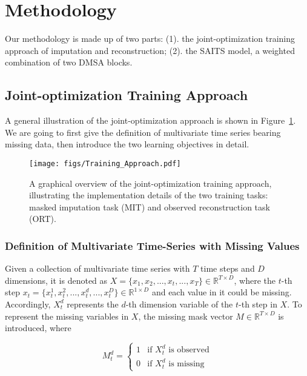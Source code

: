 \documentclass{article}
\begin{document}
\section{Methodology} \label{methodology}
Our methodology is made up of two parts: (1). the joint-optimization training approach of imputation and reconstruction; (2). the SAITS model, a weighted combination of two DMSA blocks.

\subsection{Joint-optimization Training Approach} \label{methodology: joint-optimization approach}
A general illustration of the joint-optimization approach is shown in Figure~\ref{fig0}. We are going to first give the definition of multivariate time series bearing missing data, then introduce the two learning objectives in detail.

\begin{figure}[!htb]
	\centering
	\texttt{[image: figs/Training\_Approach.pdf]}
	\caption{A graphical overview of the joint-optimization training approach, illustrating the implementation details of the two training tasks: masked imputation task (MIT) and observed reconstruction task (ORT).}
	\label{fig0}
\end{figure}

\subsubsection{Definition of Multivariate Time-Series with Missing Values}
Given a collection of multivariate time series with $T$ time steps and $D$ dimensions, it is denoted as $X = \{x_1, x_2, ..., x_t, ..., x_T\} \in \mathbb{R}^{T \times D}$, where the $t$-th step $x_t = \{x_t^1, x_t^2, ..., x_t^d, ..., x_t^D\} \in \mathbb{R}^{1 \times D}$ and each value in it could be missing. Accordingly, $X_t^d$ represents the $d$-th dimension variable of the $t$-th step in $X$. To represent the missing variables in $X$, the missing mask vector $M \in \mathbb{R}^{T \times D}$ is introduced, where 

\begin{equation*}
	M_t^d = \left\{\begin{array}{ll}
		1 & \text{if } X_t^d \text{ is observed} \\
		0 & \text{if } X_t^d \text{ is missing} 
	\end{array}\right.
\end{equation*}
\end{document}
